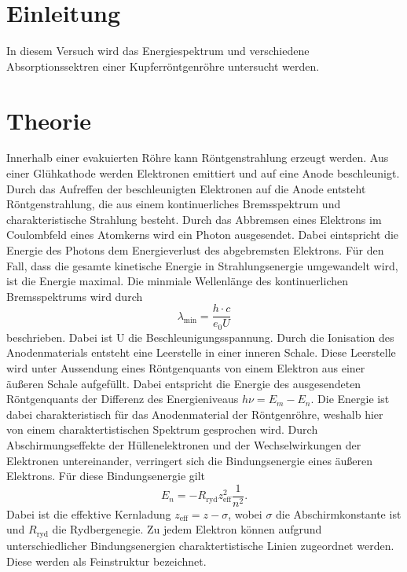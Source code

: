 
\section{Einleitung}
In diesem Versuch wird das Energiespektrum und verschiedene Absorptionssektren einer
Kupferröntgenröhre untersucht werden.
\section{Theorie}
Innerhalb einer evakuierten Röhre kann Röntgenstrahlung erzeugt werden. Aus einer Glühkathode
werden Elektronen emittiert und auf eine Anode beschleunigt. Durch das Aufreffen der beschleunigten
Elektronen auf die Anode entsteht Röntgenstrahlung, die aus einem kontinuerliches Bremsspektrum
und charakteristische Strahlung besteht.
\newline
Durch das Abbremsen eines Elektrons im Coulombfeld eines Atomkerns wird ein Photon ausgesendet.
Dabei eintspricht die Energie des Photons dem Energieverlust des abgebremsten Elektrons.
Für den Fall, dass die gesamte kinetische Energie in Strahlungsenergie umgewandelt wird, ist die Energie
maximal. Die minmiale Wellenlänge des kontinuerlichen Bremsspektrums wird durch
\begin{equation}
  \lambda_\text{min}=\frac{h\cdot c}{e_0U}
  \label{eqn:wellenlänge}
\end{equation}
beschrieben. Dabei ist U die Beschleunigungsspannung.
\newline
Durch die Ionisation des Anodenmaterials entsteht eine Leerstelle in einer inneren Schale.
Diese Leerstelle wird unter Aussendung eines Röntgenquants von einem Elektron aus einer äußeren Schale aufgefüllt.
Dabei entspricht die Energie des ausgesendeten Röntgenquants der Differenz des Energieniveaus
$h\nu =E_m-E_n$. Die Energie ist dabei charakteristisch für das Anodenmaterial der Röntgenröhre,
weshalb hier von einem charaktertistischen Spektrum gesprochen wird. Durch Abschirmungseffekte der
Hüllenelektronen und der Wechselwirkungen der Elektronen untereinander, verringert sich die Bindungsenergie
eines äußeren Elektrons. Für diese Bindungsenergie gilt
\begin{equation}
  E_n=-R_\text{ryd} z_\text{eff}^2\frac{1}{n^2}.
  \label{eqn:bindungsenergie}
\end{equation}
Dabei ist die effektive Kernladung $z_\text{eff}=z-\sigma$, wobei $\sigma$ die Abschirmkonstante ist und $R_\text{ryd}$ die
Rydbergenegie. Zu jedem Elektron können aufgrund unterschiedlicher Bindungsenergien charaktertistische
Linien zugeordnet werden. Diese werden als Feinstruktur bezeichnet.
